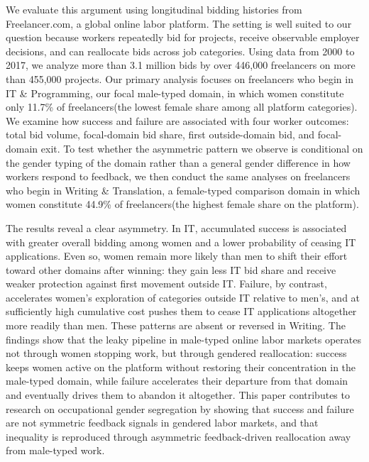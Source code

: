 \documentclass[12pt]{article}
\begin{document}
We evaluate this argument using longitudinal bidding histories from Freelancer.com, a global online labor platform. The setting is well suited to our question because workers repeatedly bid for projects, receive observable employer decisions, and can reallocate bids across job categories. Using data from 2000 to 2017, we analyze more than 3.1 million bids by over 446,000 freelancers on more than 455,000 projects. 
Our primary analysis focuses on freelancers who begin in IT \& Programming, our focal male-typed domain, in which women constitute only 11.7\% of freelancers(the lowest female share among all platform categories). We examine how success and failure are associated with four worker outcomes: total bid volume, focal-domain bid share, first outside-domain bid, and focal-domain exit. To test whether the asymmetric pattern we observe is conditional on the gender typing of the domain rather than a general gender difference in how workers respond to feedback, we then conduct the same analyses on freelancers who begin in Writing \& Translation, a female-typed comparison domain in which women constitute 44.9\% of freelancers(the highest female share on the platform).

The results reveal a clear asymmetry. In IT, accumulated success is associated with greater overall bidding among women and a lower probability of ceasing IT applications. Even so, women remain more likely than men to shift their effort toward other domains after winning: they gain less IT bid share and receive weaker protection against first movement outside IT. Failure, by contrast, accelerates women's exploration of categories outside IT relative to men's, and at sufficiently high cumulative cost pushes them to cease IT applications altogether more readily than men. These patterns are absent or reversed in Writing. The findings show that the leaky pipeline in male-typed online labor markets operates not through women stopping work, but through gendered reallocation: success keeps women active on the platform without restoring their concentration in the male-typed domain, while failure accelerates their departure from that domain and eventually drives them to abandon it altogether. This paper contributes to research on occupational gender segregation by showing that success and failure are not symmetric feedback signals in gendered labor markets, and that inequality is reproduced through asymmetric feedback-driven reallocation away from male-typed work.
\end{document}
